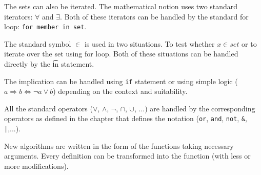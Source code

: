 \documentclass[11pt,oneside]{fithesis2}
\newcommand{\T}[1]{\texttt{#1}}
\begin{document}
The sets can also be iterated. The mathematical notion uses two standard iterators: $\forall$ and $\exists$. Both of these iterators can be handled by the standard for loop: \T{for member in set}.

The standard symbol $\in$ is used in two situations. To test whether $x \in set$ or to iterate over the set using for loop. Both of these situations can be handled directly by the \t{in} statement.

The implication can be handled using \T{if} statement or using simple logic ($a \Rightarrow b \Leftrightarrow \neg a \vee b$) depending on the context and suitability.

All the standard operators ($\vee$, $\wedge$, $\neg$, $\cap$, $\cup$, ...) are handled by the corresponding operators as defined in the chapter that defines the notation (\T{or}, \T{and}, \T{not}, \T{\&}, \T{|},...).

New algorithms are written in the form of the functions taking necessary arguments. Every definition can be transformed into the function (with less or more modifications).
\end{document}
